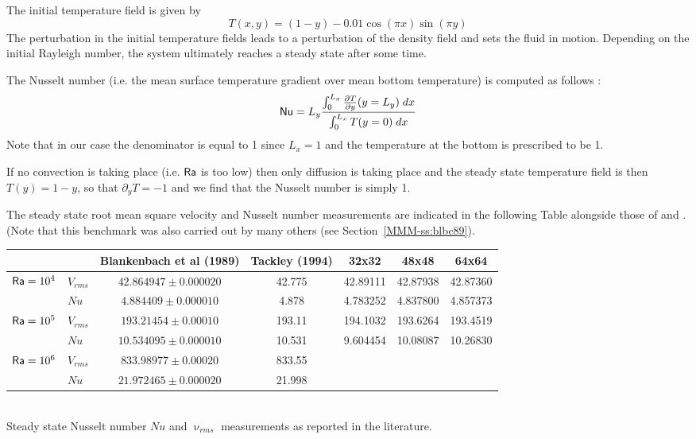 The initial temperature field is given by 
\begin{equation}
T(x,y)=(1-y) - 0.01\cos(\pi x) \sin(\pi y)
\end{equation}
The perturbation in the initial temperature fields leads to 
a perturbation of the density field and sets the fluid in motion. 
Depending on the initial Rayleigh number, the system ultimately reaches a 
steady state after some time. 

The Nusselt number (i.e. the mean surface temperature gradient over mean bottom temperature)
is computed as follows \cite{blbc89}:
\begin{equation}
{\mathsf{Nu}} = L_y \frac{\int_0^{L_x} \frac{\partial T}{\partial y}(y=L_y) \; dx  }{\int_0^{L_x} T(y=0) \; dx}
\label{eqNu}
\end{equation}
Note that in our case the denominator is equal to 1 since $L_x=1$ and the temperature at the 
bottom is prescribed to be 1.

If no convection is taking place (i.e. ${\mathsf{Ra}}$ is too low) then only diffusion is taking place 
and the steady state temperature field is then $T(y)=1-y$, so that $\partial_y T=-1$ and 
we find that the Nusselt number is simply 1.

The steady state root mean square velocity and Nusselt number measurements
are indicated in the following Table alongside those of \cite{blbc89} and \cite{tack94}.
(Note that this benchmark was also carried out by many others (see Section~\ref{MMM-ss:blbc89}).

\begin{center}
\begin{tabular}{llccccc}
\hline
          &           & Blankenbach et al (1989) & Tackley (1994)  & 32x32 & 48x48 & 64x64  \\
\hline
\hline
${\mathsf{Ra}}=10^4$ & $V_{rms}$ &  $42.864947  \pm 0.000020$ & 42.775 & 42.89111& 42.87938& 42.87360\\  
          & $Nu$      &  $4.884409   \pm 0.000010$ & 4.878  & 4.783252 & 4.837800& 4.857373\\
${\mathsf{Ra}}=10^5$ & $V_{rms}$ &  $193.21454  \pm 0.00010 $ & 193.11 & 194.1032 & 193.6264 &  193.4519  \\ 
          & $Nu$      &  $10.534095  \pm 0.000010$ & 10.531 & 9.604454& 10.08087 &  10.26830  \\
${\mathsf{Ra}}=10^6$ & $V_{rms}$ &  $833.98977  \pm 0.00020 $ & 833.55 & & & \\
          & $Nu$      &  $21.972465  \pm 0.000020$ & 21.998 & & & \\
\hline
\end{tabular}\\
{\small Steady state Nusselt number $Nu$ and $\upnu_{rms}$ measurements as reported in the literature. }
\end{center}

